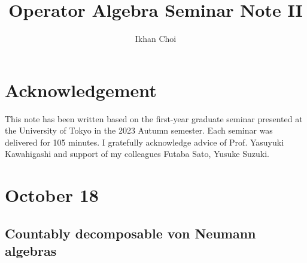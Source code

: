 \documentclass{../../small}
\begin{document}
\title{Operator Algebra Seminar Note II}
\author{Ikhan Choi}
\maketitle
\tableofcontents


\section*{Acknowledgement}
This note has been written based on the first-year graduate seminar presented at the University of Tokyo in the 2023 Autumn semester.
Each seminar was delivered for 105 minutes.
I gratefully acknowledge advice of Prof. Yasuyuki Kawahigashi and support of my colleagues Futaba Sato, Yusuke Suzuki.



\newpage
\section{October 18}

\subsection{Countably decomposable von Neumann algebras}
\end{document}
